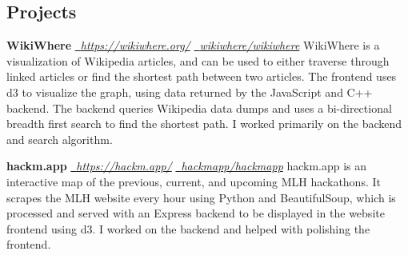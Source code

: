 \documentclass[10pt]{article}
\newcommand{\resumesection}[1]{\vspace{-0.2cm}\section*{#1}\vspace{-0.2cm}\vspace{0.1cm}}
\begin{document}
\begin{minipage}[t]{0.7\textwidth}
\begin{flushleft}
  \resumesection{Projects}

  \textbf{WikiWhere} \hfill \href{https://wikiwhere.org/}{\faLink \, \textit{https://wikiwhere.org/}} \quad \href{https://github.com/wikiwhere/wikiwhere}{\faGithub \, \textit{wikiwhere/wikiwhere}} \newline
  WikiWhere is a visualization of Wikipedia articles, and can be used to either traverse through linked articles or find the shortest path between two articles. The frontend uses d3 to visualize the graph, using data returned by the JavaScript and C++ backend. The backend queries Wikipedia data dumps and uses a bi-directional breadth first search to find the shortest path. I worked primarily on the backend and search algorithm.

  \vspace{0.25cm}

  \textbf{hackm.app} \hfill \href{https://hackm.app/}{\faLink \, \textit{https://hackm.app/}} \quad \href{https://github.com/hackmapp/hackmapp}{\faGithub \, \textit{hackmapp/hackmapp}} \newline
  hackm.app is an interactive map of the previous, current, and upcoming MLH hackathons. It scrapes the MLH website every hour using Python and BeautifulSoup, which is processed and served with an Express backend to be displayed in the website frontend using d3. I worked on the backend and helped with polishing the frontend.

  \end{flushleft}
\end{minipage}
\end{document}
